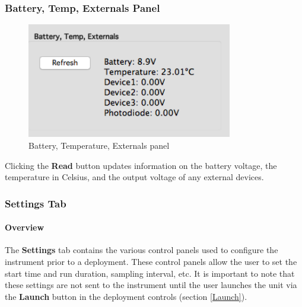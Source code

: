 \subsubsection{Battery, Temp, Externals Panel}

\begin{figure}
\centering
\vspace{-5mm}
\includegraphics[width=0.8\textwidth]{figs/Read_Batt.png}
\caption{Battery, Temperature, Externals panel}
\label{fig:ReadBatt}
\end{figure}

Clicking the \textbf{Read} button updates information on the battery voltage, the temperature in Celsius, and the output voltage of any external devices.

\vspace{30mm}


\subsubsection{Settings Tab}

\paragraph{Overview}
The \textbf{Settings} tab contains the various control panels used to configure the instrument prior to a deployment. These control panels allow the user to set the start time and run duration, sampling interval, etc. It is important to note that these settings are not sent to the instrument until the user launches the unit via the \textbf{Launch} button in the deployment controls (section \ref{Launch}).  

